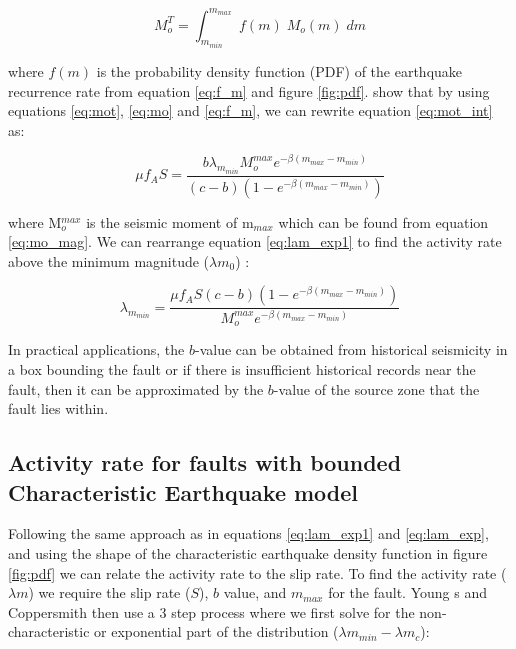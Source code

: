 \begin{enumerate}
\begin{equation} \label{eq:mot_int}
M_o^T = \int_{m_{min}}^{m_{max}} \; f(m) \; M_o(m) \; dm
\end{equation}

where $f(m)$ is the probability density function (PDF) of the earthquake recurrence rate from equation \ref{eq:f_m} and figure \ref{fig:pdf}. 
\citet{eqrm_Youngs1985} show that by using equations \ref{eq:mot}, \ref{eq:mo} and \ref{eq:f_m}, we can rewrite equation \ref{eq:mot_int} as:

\begin{equation} \label{eq:lam_exp1}
\mu f_A S= \frac{ b \lambda _{m_{min}} M_o^{max} e^{- \beta (m_{max} - m_{min} )} }  { (c - b) (1-e^{-\beta (m_{max} - m_{min}) })  }
\end{equation}

where M$_o^{max}$ is the seismic moment of m$_{max}$ which can be found from equation \ref{eq:mo_mag}. We can rearrange equation \ref{eq:lam_exp1} 
to find the activity rate above the minimum magnitude ($\lambda m_0$) :

\begin{equation} \label{eq:lam_exp}
\lambda _{m_{min}} = \frac{ \mu f_A S (c - b) (1-e^{-\beta (m_{max} - m_{min}) }) } { M_o^{max}  e^{- \beta (m_{max} - m_{min} )} }
\end{equation}

In practical applications, the $b$-value can be obtained from historical seismicity in a box bounding the 
fault \citep{eqrm_Schwartz84,eqrm_Youngs85} or if there is insufficient historical records near the fault, 
then it can be approximated by the $b$-value of the source zone that the fault lies within. 

\subsection{Activity rate for faults with bounded Characteristic Earthquake model} 
\label{sec:rv_flt_ch}

Following the same approach as in equations \ref{eq:lam_exp1} and  \ref{eq:lam_exp}, and using the shape of the characteristic 
earthquake density function in figure \ref{fig:pdf} we can relate the activity rate to the slip rate. To find the activity 
rate ($\lambda m$) we require the slip rate ($S$), $b$ value, and $m_{max}$ for the fault. Young s and Coppersmith then use 
a 3 step process where we first solve for the non-characteristic or exponential part of the distribution ($\lambda m_{min} - \lambda m_{c}$):


\end{enumerate}
